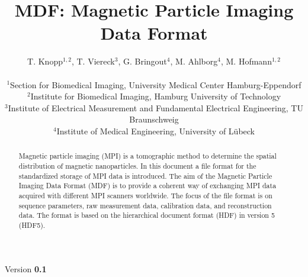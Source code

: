 \documentclass[landscape]{article} %
\begin{document}
\title{MDF: Magnetic Particle Imaging Data Format}
\newcommand{\version}{0.1}

\author{
T. Knopp$^{1,2}$, T. Viereck$^{3}$, G. Bringout$^{4}$, M. Ahlborg$^{4}$, M. Hofmann$^{1,2}$ \\ \\
$^1$Section for Biomedical Imaging, University Medical Center Hamburg-Eppendorf\\
$^2$Institute for Biomedical Imaging, Hamburg University of Technology\\
$^3$Institute of Electrical Measurement and Fundamental Electrical Engineering, TU Braunschweig\\
$^4$Institute of Medical Engineering, University of  Lübeck\\
}


\maketitle
\begin{center}
Version \textbf{\version}
\end{center}

\begin{abstract}
Magnetic particle imaging (MPI) is a tomographic method to determine the spatial distribution of magnetic nanoparticles. In this document a file format for the standardized storage of MPI data is introduced. The aim of the Magnetic Particle Imaging Data Format (MDF) is to provide a coherent way of exchanging MPI data acquired with different MPI scanners worldwide. The focus of the file format is on sequence parameters, raw measurement data, calibration data, and reconstruction data. The format is based on the hierarchical document format (HDF) in version 5 (HDF5).
\end{abstract}
\end{document}
